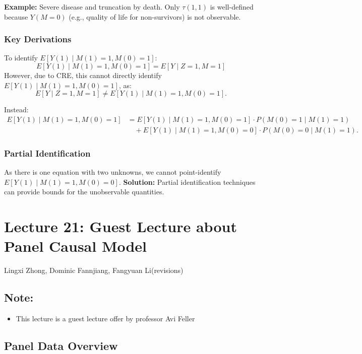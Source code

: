 \textbf{Example:} Severe disease and truncation by death. \newline
Only \( \tau(1, 1) \) is well-defined because \( Y(M = 0) \) (e.g., quality of life for non-survivors) is not observable.

\subsubsection{Key Derivations}
To identify \( E[Y(1) \mid M(1) = 1, M(0) = 1] \):
\[
E[Y(1) \mid M(1) = 1, M(0) = 1] = E[Y \mid Z = 1, M = 1] 
\]
However, due to CRE, this cannot directly identify \( E[Y(1) \mid M(1) = 1, M(0) = 1] \), as:
\[
E[Y \mid Z = 1, M = 1] \neq E[Y(1) \mid M(1) = 1, M(0) = 1].
\]

Instead:
\begin{align*}
E[Y(1) \mid M(1) = 1, M(0) = 1] &= E[Y(1) \mid M(1) = 1, M(0) = 1] \cdot P(M(0) = 1 \mid M(1) = 1) \\
&\quad + E[Y(1) \mid M(1) = 1, M(0) = 0] \cdot P(M(0) = 0 \mid M(1) = 1).
\end{align*}

\subsubsection{Partial Identification}
As there is one equation with two unknowns, we cannot point-identify \( E[Y(1) \mid M(1) = 1, M(0) = 0] \). \newline
\textbf{Solution:} Partial identification techniques can provide bounds for the unobservable quantities.

\section{Lecture 21: Guest Lecture about Panel Causal Model}{Lingxi Zhong, Dominic Fannjiang, Fangyuan Li(revisions)}

\subsection*{Note:}

\begin{itemize}
    \item This lecture is a guest lecture offer by professor Avi Feller
\end{itemize}

\subsection*{Panel Data Overview}

